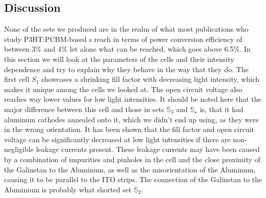 \documentclass[a4paper,10pt,twocolumn]{article}
\begin{document}
\begin{extract*}

\section{Discussion}\label{sec:discussion}
%
%
None of the sets we produced are in the realm of what most publications who study P3HT:PCBM-based \BHSC s reach in terms of power conversion efficiency of between 3\% and 4\% let alone what can be reached, which goes above 6.5\%\cite{source13}. In this section we will look at the parameters of the cells and their intensity dependence and try to explain why they behave in the way that they do.\mypar
The first cell $S_1$ showcases a shrinking fill factor with decreasing light intensity, which makes it unique among the cells we looked at. The open circuit voltage also reaches way lower values for low light intensities. It should be noted here that the major difference between this cell and those in sets $\mathbb{S}_3$ and $\mathbb{S}_\star$ is, that it had aluminum cathodes annealed onto it, which we didn't end up using, as they were in the wrong orientation. It has been shown\cite{source12} that the fill factor and open circuit voltage can be significantly decreased at low light intensities if there are non-negligible leakage currents present. These leakage currents may have been caused by a combination of impurities and pinholes in the cell and the close proximity of the Galinstan to the Aluminum, as well as the misorientation of the Aluminum, causing it to be parallel to the ITO strips. The connection of the Galinstan to the Aluminium is probably what shorted set $\mathbb{S}_2$.\mypar

\end{extract*}
\end{document}
